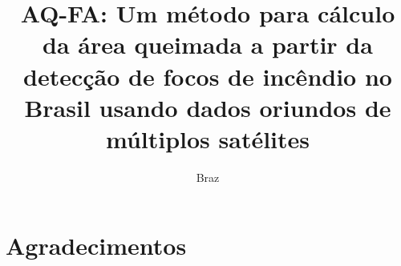 \documentclass[cic,tc]{iiufrgs}
\title{AQ-FA: Um método para cálculo da área queimada a partir da detecção de focos de incêndio no Brasil usando dados oriundos de múltiplos satélites}
\author{Braz}{José Henrique da Silva}
\begin{document}
\maketitle


\chapter*{Agradecimentos}


\tableofcontents
\end{document}
